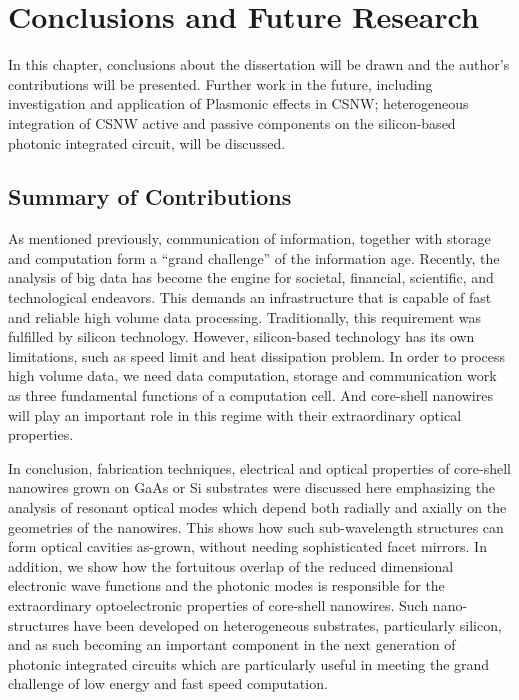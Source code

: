 \chapter{Conclusions and Future Research} \label{conclusions}

In this chapter, conclusions about the dissertation will be drawn and the
author's contributions will be presented. Further work in the future, including
investigation and application of Plasmonic effects in CSNW; heterogeneous
integration of CSNW active and passive components on the silicon-based photonic
integrated circuit, will be discussed.

\section{Summary of Contributions}

As mentioned previously, communication of information, together with storage
and computation form a “grand challenge” of the information age. Recently, the
analysis of big data has become the engine for societal, financial, scientific,
and technological endeavors. This demands an infrastructure that is capable of
fast and reliable high volume data processing. Traditionally, this requirement
was fulfilled by silicon technology. However, silicon-based technology has its
own limitations, such as speed limit and heat dissipation problem. In order to
process high volume data, we need data computation, storage and communication
work as three fundamental functions of a computation cell. And core-shell
nanowires will play an important role in this regime with their extraordinary
optical properties.

In conclusion, fabrication techniques, electrical and optical properties of
core-shell nanowires grown on GaAs or Si substrates were discussed here
emphasizing the analysis of resonant optical modes which depend both radially
and axially on the geometries of the nanowires. This shows how such
sub-wavelength structures can form optical cavities as-grown, without needing
sophisticated facet mirrors. In addition, we show how the fortuitous overlap of
the reduced dimensional electronic wave functions and the photonic modes is
responsible for the extraordinary optoelectronic properties of core-shell
nanowires. Such nano-structures have been developed on heterogeneous
substrates, particularly silicon, and as such becoming an important component
in the next generation of photonic integrated circuits which are particularly
useful in meeting the grand challenge of low energy and fast speed computation.

